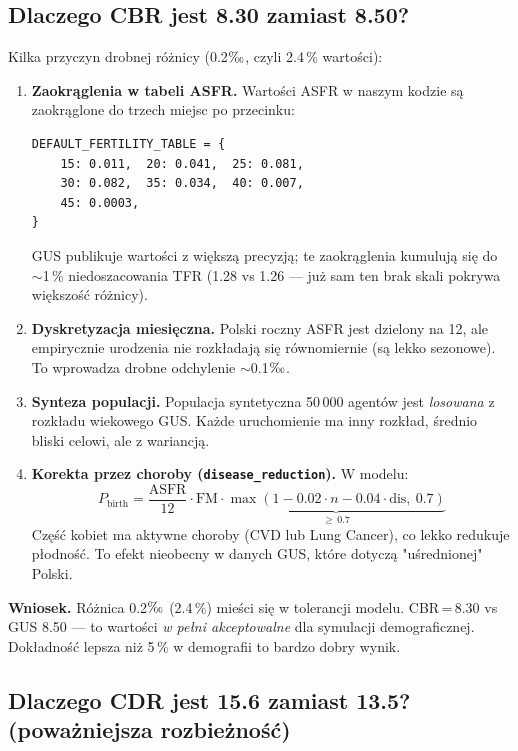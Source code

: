 \documentclass[11pt,a4paper]{article}
\newcommand{\promile}{\ensuremath{\text{\textperthousand}}}
\begin{document}
\subsection{Dlaczego CBR jest 8.30 zamiast 8.50?}

Kilka przyczyn drobnej różnicy (0.2\promile, czyli 2.4\,\% wartości):

\begin{enumerate}[leftmargin=*, itemsep=4pt]
  \item \textbf{Zaokrąglenia w tabeli ASFR.} Wartości ASFR w naszym kodzie są zaokrąglone do trzech miejsc po przecinku:
  \begin{lstlisting}
DEFAULT_FERTILITY_TABLE = {
    15: 0.011,  20: 0.041,  25: 0.081,
    30: 0.082,  35: 0.034,  40: 0.007,
    45: 0.0003,
}
\end{lstlisting}
  GUS publikuje wartości z większą precyzją; te zaokrąglenia kumulują się do $\sim$1\,\% niedoszacowania TFR (1.28 vs 1.26 --- już sam ten brak skali pokrywa większość różnicy).

  \item \textbf{Dyskretyzacja miesięczna.} Polski roczny ASFR jest dzielony na 12, ale empirycznie urodzenia nie rozkładają się równomiernie (są lekko sezonowe). To wprowadza drobne odchylenie $\sim$0.1\promile.

  \item \textbf{Synteza populacji.} Populacja syntetyczna 50\,000 agentów jest \emph{losowana} z rozkładu wiekowego GUS. Każde uruchomienie ma inny rozkład, średnio bliski celowi, ale z wariancją.

  \item \textbf{Korekta przez choroby (\texttt{disease\_reduction}).} W modelu:
  \[
  P_{\text{birth}} = \frac{\text{ASFR}}{12} \cdot \text{FM} \cdot \underbrace{\max(1 - 0.02 \cdot n - 0.04 \cdot \text{dis},\ 0.7)}_{\geq\, 0.7}
  \]
  Część kobiet ma aktywne choroby (CVD lub Lung Cancer), co lekko redukuje płodność. To efekt nieobecny w danych GUS, które dotyczą "uśrednionej" Polski.
\end{enumerate}

\begin{infobox}
\textbf{Wniosek.} Różnica 0.2\promile{} (2.4\,\%) mieści się w tolerancji modelu. CBR\,=\,8.30 vs GUS 8.50 --- to wartości \emph{w pełni akceptowalne} dla symulacji demograficznej. Dokładność lepsza niż 5\,\% w demografii to bardzo dobry wynik.
\end{infobox}

\subsection{Dlaczego CDR jest 15.6 zamiast 13.5? (poważniejsza rozbieżność)}
\label{ssec:cdr}
\end{document}
